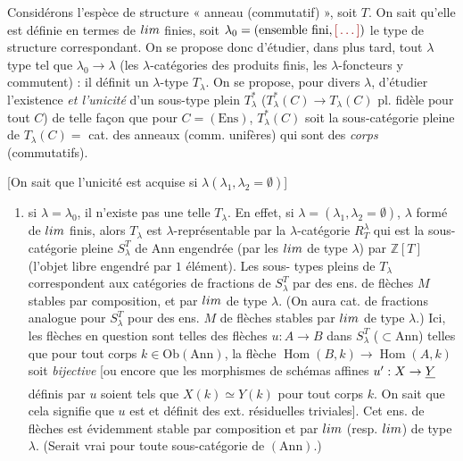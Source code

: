 \documentclass[11pt,a4paper]{article}
\begin{document}

Considérons l'espèce de structure « anneau (commutatif) », soit $T$. On sait
qu'elle est définie en termes de $\varprojlim$ finies, soit
$\lambda_{0} = (\text{ensemble fini}, \ill{})$ le type de structure
correspondant. On se propose donc d'étudier, dans plus tard, tout $\lambda$ type
tel que $\lambda_{0} \to \lambda$ (les $\lambda$-catégories \ill{} des produits
finis, les $\lambda$-foncteurs y commutent) : il définit un $\lambda$-type
$T_{\lambda}$. On se propose, pour divers $\lambda$, d'étudier l'existence
\emph{et l'unicité} d'un sous-type plein $T^{*}_{\lambda}$
($T^{*}_{\lambda}(C) \to T_{\lambda}(C)$ pl. fidèle pour tout $C$) de telle façon
que pour $C = (\mathrm{Ens})$, $T^{*}_{\lambda}(C)$ soit la sous-catégorie pleine
de $T_{\lambda}(C) = $ cat. des anneaux (comm. unifères) qui sont des
\emph{corps} (commutatifs).

[On sait que l'unicité est acquise si $\lambda(\lambda_{1}, \lambda_{2} =
\emptyset)$]
\begin{enumerate}
\item[a)] si $\lambda = \lambda_{0}$, il n'existe pas une telle
$T_{\lambda}$. En effet, si $\lambda = (\lambda_{1}, \lambda_{2} = \emptyset)$,
$\lambda$ formé de $\varinjlim$ \ill{} finis, alors $T_{\lambda}$ est
$\lambda$-représentable par la $\lambda$-catégorie $R^{\lambda}_{T}$ qui est la
sous-catégorie pleine $S^{T}_{\lambda}$ de $\mathrm{Ann}$ engendrée (par les
$\varinjlim$ de type $\lambda$) par $\mathbb{Z}[T]$ (l'objet libre engendré par
$1$ élément). Les sous- types pleins de $T_{\lambda}$
 correspondent aux catégories de fractions de
$S^{T}_{\lambda}$ par des ens. de flèches $M$ stables par composition, et par
$\varinjlim$ de type $\lambda$. (On aura cat.  de fractions
analogue pour $S^{T}_{\lambda}$ pour des ens. $M$ de flèches stables par
$\varinjlim$ de type $\lambda$.) Ici, les flèches en question sont \struck{\ill{}}
telles \struck{\ill{}} des flèches $u : A \to B$ dans
$S^{T}_{\lambda}$ ($\subset \mathrm{Ann}$) telles que pour tout corps
$k \in \mathrm{Ob}(\mathrm{Ann})$, la flèche
$\operatorname{Hom}(B, k) \to \operatorname{Hom}(A, k)$ soit
\emph{bijective} [ou encore que les morphismes de schémas affines
$u' : X \to \struck{Y}$ définis par $u$ soient tels que $X(k) \simeq Y(k)$ pour
tout corps $k$. On sait que cela signifie que $u$ est  et
définit des ext. résiduelles triviales]. \struck{\ill{}} Cet ens. de flèches est
évidemment stable par composition et par $\varinjlim$ (resp. $\varprojlim$) de
type $\lambda$. (Serait vrai pour toute sous-catégorie de $(\mathrm{Ann})$.)
\end{enumerate}
\end{document}
